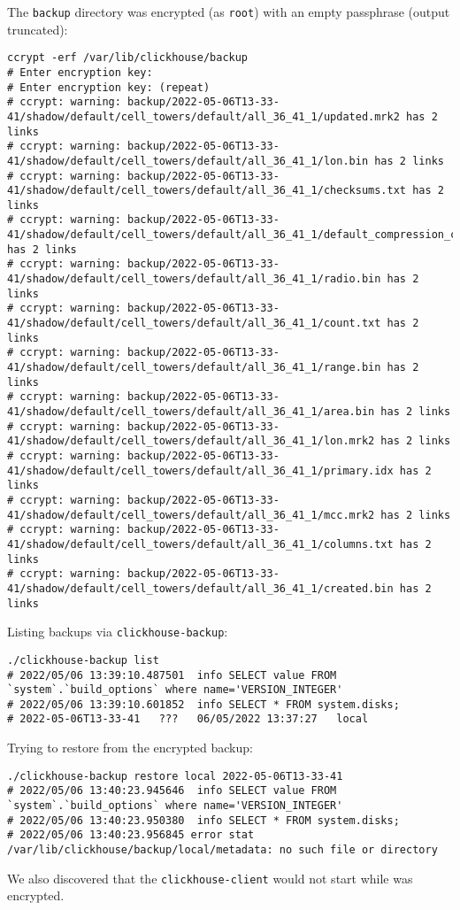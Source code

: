 The \texttt{backup} directory was encrypted (as \texttt{root}) with an empty passphrase (output truncated):
\begin{verbatim}
ccrypt -erf /var/lib/clickhouse/backup
# Enter encryption key:
# Enter encryption key: (repeat)
# ccrypt: warning: backup/2022-05-06T13-33-41/shadow/default/cell_towers/default/all_36_41_1/updated.mrk2 has 2 links
# ccrypt: warning: backup/2022-05-06T13-33-41/shadow/default/cell_towers/default/all_36_41_1/lon.bin has 2 links
# ccrypt: warning: backup/2022-05-06T13-33-41/shadow/default/cell_towers/default/all_36_41_1/checksums.txt has 2 links
# ccrypt: warning: backup/2022-05-06T13-33-41/shadow/default/cell_towers/default/all_36_41_1/default_compression_codec.txt has 2 links
# ccrypt: warning: backup/2022-05-06T13-33-41/shadow/default/cell_towers/default/all_36_41_1/radio.bin has 2 links
# ccrypt: warning: backup/2022-05-06T13-33-41/shadow/default/cell_towers/default/all_36_41_1/count.txt has 2 links
# ccrypt: warning: backup/2022-05-06T13-33-41/shadow/default/cell_towers/default/all_36_41_1/range.bin has 2 links
# ccrypt: warning: backup/2022-05-06T13-33-41/shadow/default/cell_towers/default/all_36_41_1/area.bin has 2 links
# ccrypt: warning: backup/2022-05-06T13-33-41/shadow/default/cell_towers/default/all_36_41_1/lon.mrk2 has 2 links
# ccrypt: warning: backup/2022-05-06T13-33-41/shadow/default/cell_towers/default/all_36_41_1/primary.idx has 2 links
# ccrypt: warning: backup/2022-05-06T13-33-41/shadow/default/cell_towers/default/all_36_41_1/mcc.mrk2 has 2 links
# ccrypt: warning: backup/2022-05-06T13-33-41/shadow/default/cell_towers/default/all_36_41_1/columns.txt has 2 links
# ccrypt: warning: backup/2022-05-06T13-33-41/shadow/default/cell_towers/default/all_36_41_1/created.bin has 2 links
\end{verbatim}

Listing backups via \texttt{clickhouse-backup}:
\begin{verbatim}
./clickhouse-backup list
# 2022/05/06 13:39:10.487501  info SELECT value FROM `system`.`build_options` where name='VERSION_INTEGER'
# 2022/05/06 13:39:10.601852  info SELECT * FROM system.disks;
# 2022-05-06T13-33-41   ???   06/05/2022 13:37:27   local
\end{verbatim}

Trying to restore from the encrypted backup:
\begin{verbatim}
./clickhouse-backup restore local 2022-05-06T13-33-41
# 2022/05/06 13:40:23.945646  info SELECT value FROM `system`.`build_options` where name='VERSION_INTEGER'
# 2022/05/06 13:40:23.950380  info SELECT * FROM system.disks;
# 2022/05/06 13:40:23.956845 error stat /var/lib/clickhouse/backup/local/metadata: no such file or directory
\end{verbatim}

We also discovered that the \texttt{clickhouse-client} would not start while  was encrypted.
